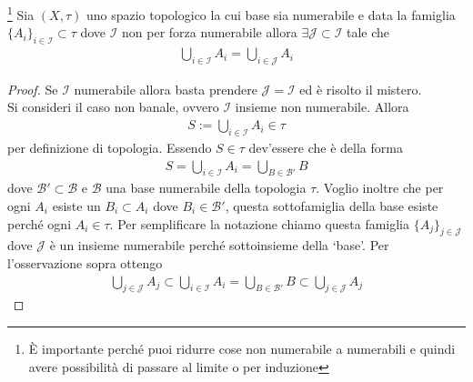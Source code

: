 \begin{theorem}\footnote{È importante perché puoi ridurre cose non numerabile a numerabili e quindi avere possibilità di passare al limite o per induzione}
	Sia $(X,\tau)$ uno spazio topologico la cui base sia numerabile e data la famiglia $\{A_i\}_{i\in \mathcal{I}} \subset \tau$ dove $\mathcal{I}$ non per forza numerabile allora $\exists \mathcal{J} \subset \mathcal{I}$ tale che 
	\begin{equation}
	\begin{aligned}
		\bigcup_{i \in \mathcal{I}} A_i = \bigcup_{i \in \mathcal{J}} A_i
	\end{aligned}
	\end{equation}
\end{theorem}
\begin{proof}
	Se $\mathcal{I}$ numerabile allora basta prendere $\mathcal{J} = \mathcal{I}$ ed è risolto il mistero.\\
	Si consideri il caso non banale, ovvero $\mathcal{I}$ insieme non numerabile. Allora 
	\begin{equation}
	\begin{aligned}
		S := \bigcup_{i \in \mathcal{I}} A_i \in \tau
	\end{aligned}
	\end{equation}
	per definizione di topologia. Essendo $S \in \tau$ dev'essere che è della forma
	\begin{equation}
	\begin{aligned}
		S = \bigcup_{i \in \mathcal{I}} A_i = \bigcup_{B \in \mathcal{B}'} B
	\end{aligned}
	\end{equation}
	dove $\mathcal{B}' \subset \mathcal{B}$ e $\mathcal{B}$ una base numerabile della topologia $\tau$. Voglio inoltre che per ogni $A_i$ esiste un $B_i \subset A_i$ dove $B_i \in \mathcal{B}'$, questa sottofamiglia della base esiste perché ogni $A_i \in \tau$. Per semplificare la notazione chiamo questa famiglia $\{A_j\}_{j \in \mathcal{J}}$ dove $\mathcal{J}$ è un insieme numerabile perché sottoinsieme della `base'. Per l'osservazione sopra ottengo
	\begin{equation}
	\begin{aligned}
		\bigcup_{j \in \mathcal{J}}  A_j \subset \bigcup_{i \in \mathcal{I}} A_i = \bigcup_{B \in \mathcal{B}'} B \subset \bigcup_{j \in \mathcal{J}}  A_j
	\end{aligned}
	\end{equation}
\end{proof}

